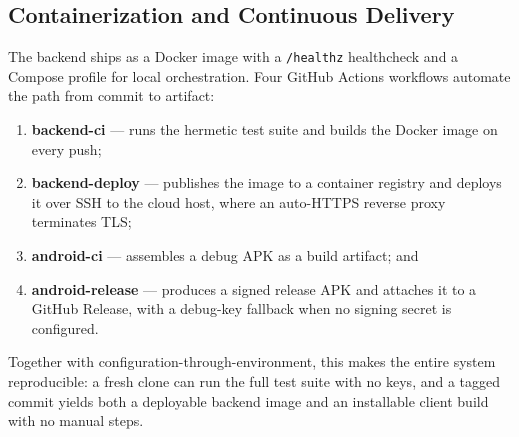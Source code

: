 \subsection{Containerization and Continuous Delivery}

The backend ships as a Docker image with a \texttt{/healthz} healthcheck and
a Compose profile for local orchestration. Four GitHub Actions workflows
automate the path from commit to artifact:

\begin{enumerate}
  \item \textbf{backend-ci} --- runs the hermetic test suite and builds the
        Docker image on every push;
  \item \textbf{backend-deploy} --- publishes the image to a container
        registry and deploys it over SSH to the cloud host, where an
        auto-HTTPS reverse proxy terminates TLS;
  \item \textbf{android-ci} --- assembles a debug APK as a build artifact;
        and
  \item \textbf{android-release} --- produces a signed release APK and
        attaches it to a GitHub Release, with a debug-key fallback when no
        signing secret is configured.
\end{enumerate}

Together with configuration-through-environment, this makes the entire system
reproducible: a fresh clone can run the full test suite with no keys, and a
tagged commit yields both a deployable backend image and an installable
client build with no manual steps.
